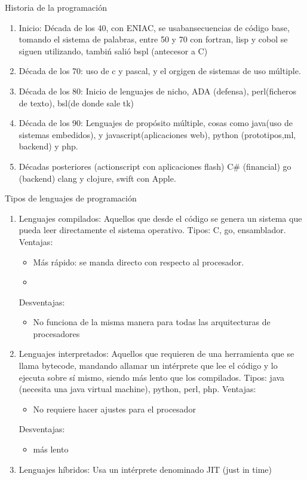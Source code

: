 \documentclass{article}
\begin{document}
  \begin{center}
    Historia de la programación
  \end{center}
  \begin{enumerate}
    \item Inicio: Década de los 40, con ENIAC, se usabansecuencias de código base, tomando el sistema de palabras, entre 50 y 70 con fortran, lisp y cobol se siguen utilizando, tambiń salió bspl (antecesor a C)
    \item Década de los 70: uso de c y pascal, y el orgigen de sistemas de uso múltiple.
    \item Década de los 80: Inicio de lenguajes de nicho, ADA (defensa), perl(ficheros de texto), bsl(de donde sale tk)
    \item Década de los 90: Lenguajes de propósito múltiple, cosas como java(uso de sistemas embedidos), y javascript(aplicaciones web), python (prototipos,ml, backend) y php.
    \item Décadas posteriores (actionscript con aplicaciones flash) C\# (financial) go (backend) clang y clojure, swift con Apple.
  \end{enumerate}
  \begin{center}
    Tipos de lenguajes de programación
  \end{center}

  \begin{enumerate}
    \item Lenguajes compilados: Aquellos que desde el código se genera un sistema que pueda leer directamente el sistema operativo. Tipos: C, go, ensamblador. Ventajas:
      \begin{itemize}
        \item Más rápido: se manda directo con respecto al procesador.
        \item 
      \end{itemize} 
      Desventajas: 
      \begin{itemize}
        \item No funciona de la misma manera para todas las arquitecturas de procesadores
      \end{itemize}
    \item Lenguajes interpretados: Aquellos que requieren de una herramienta que se llama bytecode, mandando allamar un intérprete que lee el código y lo ejecuta sobre sí mismo, siendo más lento que los compilados. Tipos: java (necesita una java virtual machine), python, perl, php.
      Ventajas: 
      \begin{itemize}
        \item No requiere hacer ajustes para el procesador
      \end{itemize}
      Desventajas:
      \begin{itemize}
        \item más lento
      \end{itemize}
    \item Lenguajes híbridos: Usa un intérprete denominado JIT (just in time)
  \end{enumerate}
\end{document}
